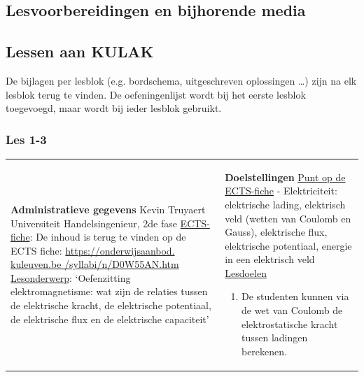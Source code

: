 


\begin{landscape}
	\section{Lesvoorbereidingen en bijhorende media}
	\subsection{Lessen aan KULAK}
	De bijlagen per lesblok (e.g. bordschema, uitgeschreven oplossingen \ldots) zijn na elk lesblok terug te vinden. De oefeningenlijst wordt bij het eerste lesblok toegevoegd, maar wordt bij ieder lesblok gebruikt.
	\subsubsection{Les 1-3}
	\begin{tabularx}{1.56\textwidth}{|p{}|X|}\hline
		\textbf{Administratieve gegevens}\newline\newline
		Kevin Truyaert\newline\newline
		Universiteit\newline
		Handelsingenieur, 2de fase\newline
		\underline{ECTS-fiche}: De inhoud is terug te vinden op de ECTS fiche: \href{https://onderwijsaanbod.kuleuven.be/syllabi/n/D0W55AN.htm}{https://onderwijsaanbod. kuleuven.be /syllabi/n/D0W55AN.htm} \newline
		\underline{Lesonderwerp}: `Oefenzitting elektromagnetisme: wat zijn de relaties tussen de elektrische kracht, de  elektrische potentiaal, de elektrische flux en de elektrische capaciteit' & \textbf{Doelstellingen}\newline\vspace{0.5cm}
		\underline{Punt op de ECTS-fiche}
		\vspace{-0.5cm}\newline  - Elektriciteit: elektrische lading, elektrisch veld (wetten van Coulomb en Gauss), elektrische flux, elektrische potentiaal, energie in een elektrisch veld \newline
		\underline{Lesdoelen}\newline
		\vspace{-0.75cm}
		\begin{enumerate}[itemsep=0.08\baselineskip]
			\item De studenten kunnen via de wet van Coulomb de elektrostatische kracht tussen ladingen berekenen.

\end{enumerate}
\end{tabularx}
\end{landscape}
